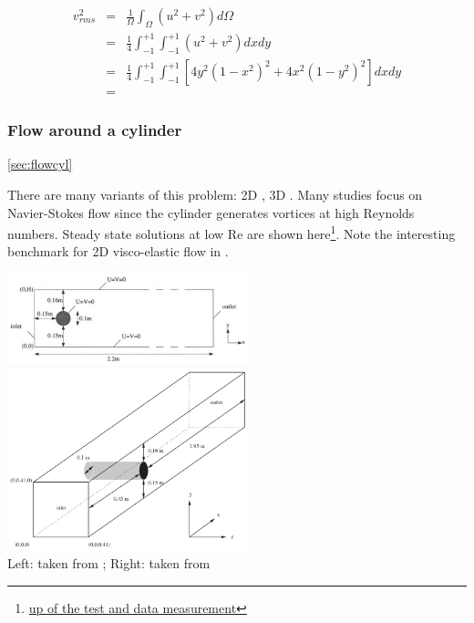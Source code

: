 \begin{eqnarray}
v_{rms}^2 
&=& \frac{1}{\Omega} \int_\Omega (u^2+v^2) d\Omega \nonumber\\
&=& \frac{1}{4} \int_{-1}^{+1}\int_{-1}^{+1} (u^2+v^2) dxdy \nonumber\\
&=& \frac{1}{4} \int_{-1}^{+1}\int_{-1}^{+1} [ 4y^2(1-x^2)^2 + 4x^2(1-y^2)^2   ] dxdy \nonumber\\
&=& 
\end{eqnarray}




\subsubsection{Flow around a cylinder} \ref{sec:flowcyl}

There are many variants of this problem: 2D \cite{turek}, 3D \cite{john02}.
Many studies focus on Navier-Stokes flow since the cylinder generates
vortices at high Reynolds numbers. Steady state solutions at low Re are shown 
here\footnote{\url{up of the test and data measurement}}.
Note the interesting benchmark for 2D visco-elastic flow in \cite{bepo10}.

\begin{center}
\includegraphics[width=7cm]{images/benchmark_flow_cylinder/turek}
\includegraphics[width=7cm]{images/benchmark_flow_cylinder/john02}\\
{\captionfont Left: taken from \cite{turek}; Right: taken from \cite{john02}}
\end{center}

